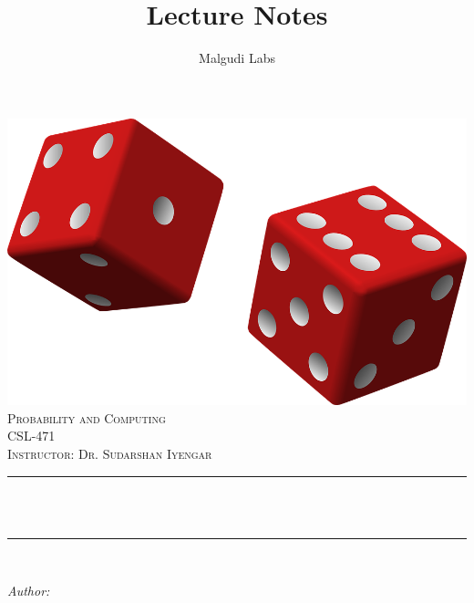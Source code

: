 \documentclass[a4paper]{article}
\title{Lecture Notes}					%
\author{Malgudi Labs}					%
\makeatletter
\let\thetitle\@title
\let\theauthor\@author
\makeatother
\begin{document}

\begin{titlepage}
	\centering
    \vspace*{0.0 cm}
    \includegraphics[scale = 0.1]{dice.png}\\[.0 cm]	%
    \textsc{\LARGE Probability and Computing}\\[2.0 cm]	%
	\textsc{\Large CSL-471}\\[0.5 cm]				%
	\textsc{\large Instructor: Dr. Sudarshan Iyengar}\\[0.5 cm]		%
	\rule{\linewidth}{0.2 mm} \\[0.4 cm]
	{ \huge \bfseries \thetitle}\\
	\rule{\linewidth}{0.2 mm} \\[1.5 cm]
	
	\begin{minipage}{0.4\textwidth}
		\begin{center} \large
			\emph{Author:}\\
			\theauthor\linebreak
			\end{center}
	\end{minipage}\\[2 cm]
	
 
	\vfill
	
\end{titlepage}

\end{document}
